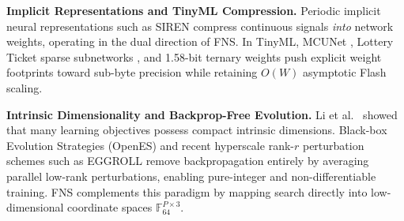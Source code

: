 \textbf{Implicit Representations and TinyML Compression.} Periodic implicit neural representations such as SIREN \cite{sitzmann2020siren} compress continuous signals \textit{into} network weights, operating in the dual direction of FNS. In TinyML, MCUNet \cite{lin2020mcunet}, Lottery Ticket sparse subnetworks \cite{frankle2019lottery}, and 1.58-bit ternary weights \cite{ma2024bitnet} push explicit weight footprints toward sub-byte precision while retaining $O(W)$ asymptotic Flash scaling.

\textbf{Intrinsic Dimensionality and Backprop-Free Evolution.} Li et al.\ \cite{li2018intrinsic} showed that many learning objectives possess compact intrinsic dimensions. Black-box Evolution Strategies (OpenES) \cite{salimans2017evolution} and recent hyperscale rank-$r$ perturbation schemes such as EGGROLL \cite{sarkar2025eggroll} remove backpropagation entirely by averaging parallel low-rank perturbations, enabling pure-integer and non-differentiable training. FNS complements this paradigm by mapping search directly into low-dimensional coordinate spaces $\mathbb{F}_{64}^{P\times 3}$.

